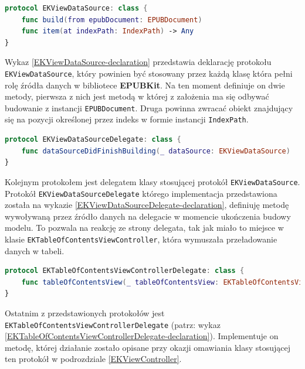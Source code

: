 \begin{lstlisting}[language=swift,caption={Deklaracja protokołu \texttt{EKViewDataSource}}, label=EKViewDataSource-declaration]
protocol EKViewDataSource: class {
    func build(from epubDocument: EPUBDocument)
    func item(at indexPath: IndexPath) -> Any
}
\end{lstlisting}

Wykaz \ref{EKViewDataSource-declaration} przedstawia deklarację protokołu \texttt{EKViewDataSource}, który powinien być stosowany przez każdą klasę która pełni rolę źródła danych w bibliotece \textbf{EPUBKit}. Na ten moment definiuje on dwie metody, pierwsza z nich jest metodą w której z założenia ma się odbywać budowanie z instancji \texttt{EPUBDocument}. Druga powinna zwracać obiekt znajdujący się na pozycji określonej przez indeks w formie instancji \texttt{IndexPath}.

\begin{lstlisting}[language=swift,caption={Deklaracja protokołu \texttt{EKViewDataSourceDelegate}}, label=EKViewDataSourceDelegate-declaration]
protocol EKViewDataSourceDelegate: class {
    func dataSourceDidFinishBuilding(_ dataSource: EKViewDataSource)
}
\end{lstlisting}

Kolejnym protokołem jest delegatem klasy stosującej protokół \texttt{EKViewDataSource}. Protokół \texttt{EKViewDataSourceDelegate} którego implementacja przedstawiona została na wykazie \ref{EKViewDataSourceDelegate-declaration}, definiuję metodę wywoływaną przez źródło danych na delegacie w momencie ukończenia budowy modelu. To pozwala na reakcję ze strony delegata, tak jak miało to miejsce w klasie \texttt{EKTableOfContentsViewController}, która wymuszała przeładowanie danych w tabeli.

\begin{lstlisting}[language=swift,caption={Deklaracja protokołu \texttt{EKTableOfContentsViewControllerDelegate}}, label=EKTableOfContentsViewControllerDelegate-declaration]
protocol EKTableOfContentsViewControllerDelegate: class {
    func tableOfContentsView(_ tableOfContentsView: EKTableOfContentsViewController, didSelectRowAt indexPath: IndexPath)
}
\end{lstlisting}

Ostatnim z przedstawionych protokołów jest \texttt{EKTableOfContentsViewControllerDelegate} (patrz: wykaz \ref{EKTableOfContentsViewControllerDelegate-declaration}). Implementuje on metodę, której działanie zostało opisane przy okazji omawiania klasy stosującej ten protokół w podrozdziale \ref{EKViewController}.


